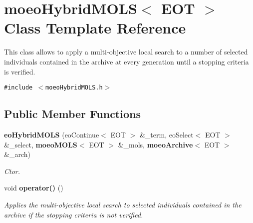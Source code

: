 \section{moeo\-Hybrid\-MOLS$<$ EOT $>$ Class Template Reference}
\label{classmoeoHybridMOLS}
This class allows to apply a multi-objective local search to a number of selected individuals contained in the archive at every generation until a stopping criteria is verified.  


{\tt \#include $<$moeo\-Hybrid\-MOLS.h$>$}

\subsection*{Public Member Functions}
\begin{CompactItemize}
\item 
{\bf eo\-Hybrid\-MOLS} (eo\-Continue$<$ EOT $>$ \&\_\-term, eo\-Select$<$ EOT $>$ \&\_\-select, {\bf moeo\-MOLS}$<$ EOT $>$ \&\_\-mols, {\bf moeo\-Archive}$<$ EOT $>$ \&\_\-arch)
\begin{CompactList}\small\item\em Ctor. \item\end{CompactList}\item 
void {\bf operator()} ()\label{classmoeoHybridMOLS_f62b4221d0ec094e39b73b386b508fc1}

\begin{CompactList}\small\item\em Applies the multi-objective local search to selected individuals contained in the archive if the stopping criteria is not verified. \item\end{CompactList}\end{CompactItemize}
